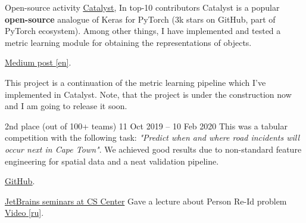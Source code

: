 
\cvevent
{Open-source activity}
{\href{https://github.com/catalyst-team/catalyst}{\underline{Catalyst}}, In top-10 contributors}{}{}
Catalyst is a popular \textbf{open-source} analogue of Keras for PyTorch (3k stars on GitHub, part of PyTorch ecosystem).
Among other things, I have implemented and tested a metric learning module for obtaining the representations of objects.
\smallskip

\href{https://medium.com/pytorch/metric-learning-with-catalyst-8c8337dfab1a}{\underline{Medium post} [en]}.

\smallskip
\smallskip
\smallskip

This project is a continuation of the metric learning pipeline which I've implemented in Catalyst.
Note, that the project is under the construction now and I am going to release it soon.


\divider

{2nd place (out of 100+ teams)}
{11 Oct 2019 -- 10 Feb 2020}{}
This was a tabular competition with the following task: \textit{"Predict when and where road incidents will occur next in Cape Town"}. We achieved good results due to non-standard feature engineering for spatial data and a neat validation pipeline.
\smallskip

\href{https://github.com/AlekseySh/uber_competition}{\underline{GitHub}}.

\divider

\cvevent
{\href{https://research.jetbrains.org/groups/plt_lab/seminars}{JetBrains seminars at CS Center}}
{Gave a lecture about Person Re-Id problem}
{}
{}
{\href{https://youtu.be/O8qtBYeOSKE}{\underline{Video} [ru]}.}
